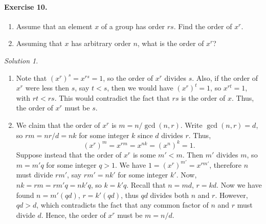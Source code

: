 \documentclass[11pt]{report}
\theoremstyle{remark}
\newtheorem*{solution}{Solution}
\begin{document}
    \paragraph{Exercise 10.} \mbox{}
    \begin{enumerate}
        \itemsep0em 
        \item Assume that an element $x$ of a group has order $rs$. Find the order
        of $x^r$.
        \item Assuming that $x$ has arbitrary order $n$, what is the order of $x^r$?
    \end{enumerate}
    \begin{solution}
    \begin{enumerate}
        We first show that if $x$ has order $n$ and $x^m = 1$, then $n$ divides $m$.
        Note that $n \leq m$, since $n$ is chosen to be the least natural number
        satisfying $x^{n} = 1$. Thus, use Euclid's Division Lemma to write $m = nq +
        r$ for integers $q > 0$, $0 \leq r < n$. We now have \[
            1 = x^{m} = x^{nq + r} = (x^{n})^qx^r = x^r.
        \] Since $r < n$, the only possibility is $r = 0$, hence $m = nq$, proving
        that $n$ divides $m$.

        \item Note that $(x^{r})^s = x^{rs} = 1$, so the order of $x^r$ divides $s$.
        Also, if the order of $x^r$ were less then $s$, say $t < s$, then we would
        have $(x^r)^t = 1$, so $x^{rt} = 1$, with $rt < rs$. This would contradict
        the fact that $rs$ is the order of $x$. Thus, the order of $x^r$ must be
        $s$.

        \item We claim that the order of $x^r$ is $m = n / \gcd(n, r)$. Write
        $\gcd(n, r) = d$, so $rm = nr / d = nk$ for some integer $k$ since $d$
        divides $r$.
        Thus, \[
            (x^r)^m = x^{rm} = x^{nk} = (x^n)^k = 1.
        \] Suppose instead that the order of $x^r$ is some $m' < m$. Then $m'$ divides
        $m$, so $m = m'q$ for some integer $q > 1$. We have $1 = (x^r)^{m'} = x^{rm'}$, 
        therefore $n$ must divide $rm'$, say $rm' = nk'$ for some integer $k'$. Now,
        $nk = rm = rm'q = nk'q$, so $k = k'q$. Recall that $n = md$, $r = kd$. Now
        we have found $n = m'(qd)$, $r = k'(qd)$, thus $qd$ divides both $n$ and
        $r$. However, $qd > d$, which contradicts the fact that any common factor of
        $n$ and $r$ must divide $d$. Hence, the order of $x^r$ must be $m = n / d$.
    \end{enumerate}
    \end{solution}
    
\end{document}
